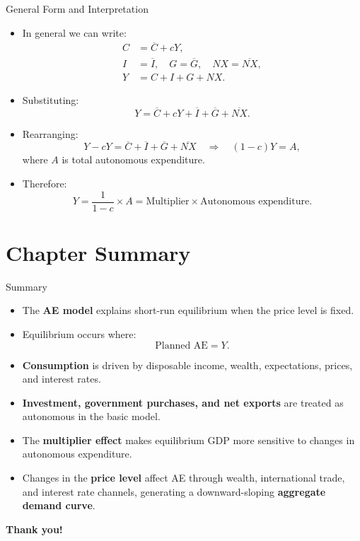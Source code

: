 \documentclass[aspectratio=169]{beamer}
\begin{document}
\begin{frame}{General Form and Interpretation}
\transfade
\begin{itemize}[<+->]
  \item In general we can write:
  \begin{align*}
    C &= \overline{C} + cY,\\
    I &= \overline{I},\quad
    G = \overline{G},\quad
    NX = \overline{NX},\\
    Y &= C + I + G + NX.
  \end{align*}
  \item Substituting:
  \[
    Y = \overline{C} + cY + \overline{I} + \overline{G} + \overline{NX}.
  \]
  \item Rearranging:
  \[
    Y - cY = \overline{C} + \overline{I} + \overline{G} + \overline{NX}
    \quad \Rightarrow \quad
    (1 - c)Y = A,
  \]
  where \(A\) is total autonomous expenditure.
  \item Therefore:
  \[
    Y = \frac{1}{1 - c} \times A
      = \text{Multiplier} \times \text{Autonomous expenditure}.
  \]
\end{itemize}
\end{frame}

\section*{Chapter Summary}

\begin{frame}{Summary}
\transfade
\begin{itemize}[<+->]
  \item The \textbf{AE model} explains short-run equilibrium when the price level is fixed.
  \item Equilibrium occurs where:
  \[
    \text{Planned AE} = Y.
  \]
  \item \textbf{Consumption} is driven by disposable income, wealth, expectations, prices, and interest rates.
  \item \textbf{Investment, government purchases, and net exports} are treated as autonomous in the basic model.
  \item The \textbf{multiplier effect} makes equilibrium GDP more sensitive to changes in autonomous expenditure.
  \item Changes in the \textbf{price level} affect AE through wealth, international trade, and interest rate channels, generating a downward-sloping \textbf{aggregate demand curve}.
\end{itemize}
\end{frame}

\begin{frame}
\centering
\Huge \textbf{Thank you!}
\end{frame}
\end{document}
